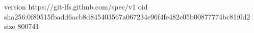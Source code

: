 version https://git-lfs.github.com/spec/v1
oid sha256:0f80515fbadd6acb8d845403567a067234e96f4fe482c05b00877774bc81f0d2
size 800741
